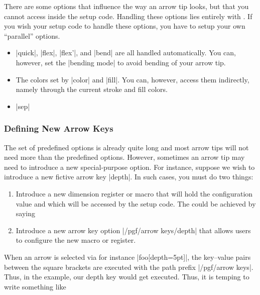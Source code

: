 There are some options that influence the way an arrow tip looks, but that you
cannot access inside the setup code. Handling these options lies entirely with
\pgfname. If you wish your setup code to handle these options, you have to
setup your own ``parallel'' options.
%
\begin{itemize}
    \item |quick|, |flex|, |flex'|, and |bend| are all handled automatically.
        You can, however, set the |bending mode| to avoid bending of your arrow
        tip.
    \item The colors set by |color| and |fill|. You can, however, access them
        indirectly, namely through the current stroke and fill colors.
    \item |sep|
\end{itemize}


\subsubsection{Defining New Arrow Keys}
\label{section-arrow-option-cache}

The set of predefined options is already quite long and most arrow tips will
not need more than the predefined options. However, sometimes an arrow tip may
need to introduce a new special-purpose option. For instance, suppose we wish
to introduce a new fictive arrow key |depth|. In such cases, you must do two
things:
%
\begin{enumerate}
    \item Introduce a new dimension register or macro that will hold the
        configuration value and which will be accessed by the setup code. The
        could be achieved by saying
\begin{codeexample}
\newdimen\pgfarrowdepth
\end{codeexample}
    \item Introduce a new arrow key option |/pgf/arrow keys/depth| that allows
        users to configure the new macro or register.
\end{enumerate}

When an arrow is selected via for instance |foo[depth=5pt]|, the key--value
pairs between the square brackets are executed with the path prefix
|/pgf/arrow keys|. Thus, in the example, our depth key would get executed.
Thus, it is temping  to write something like
%
\begin{codeexample}
\end{codeexample}

